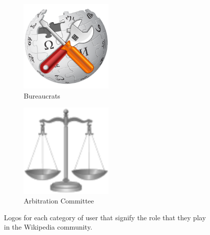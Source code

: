 \begin{figure}[h!]
    \begin{subfigure}[b]{0.49\textwidth}
        \centering
        \includegraphics[width=0.5\textwidth]{images/bureaucrat.pdf}
        \caption{Bureaucrats}
        \label{fig:crats}
    \end{subfigure}
    \begin{subfigure}[b]{0.49\textwidth}
        \centering
        \includegraphics[width=0.5\textwidth]{images/arbcom.pdf}
        \caption{Arbitration Committee}
        \label{fig:arbs}
    \end{subfigure}
    \caption{Logos for each category of user that signify the role that they play in the Wikipedia community.}
    \label{fig:logos}
\end{figure}

